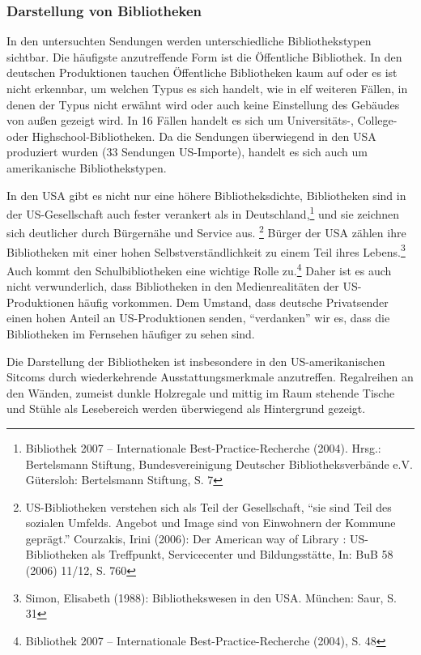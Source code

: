 \subsubsection{Darstellung von
Bibliotheken}\label{darstellung-von-bibliotheken}

In den untersuchten Sendungen werden unterschiedliche Bibliothekstypen
sichtbar. Die häufigste anzutreffende Form ist die Öffentliche
Bibliothek. In den deutschen Produktionen tauchen Öffentliche
Bibliotheken kaum auf oder es ist nicht erkennbar, um welchen Typus es
sich handelt, wie in elf weiteren Fällen, in denen der Typus nicht
erwähnt wird oder auch keine Einstellung des Gebäudes von außen gezeigt
wird. In 16 Fällen handelt es sich um Universitäts-, College- oder
Highschool-Bibliotheken. Da die Sendungen überwiegend in den USA
produziert wurden (33 Sendungen US-Importe), handelt es sich auch um
amerikanische Bibliothekstypen.

In den USA gibt es nicht nur eine höhere Bibliotheksdichte, Bibliotheken
sind in der US-Gesellschaft auch fester verankert als in
Deutschland,\footnote{Bibliothek 2007 -- Internationale
  Best-Practice-Recherche (2004). Hrsg.: Bertelsmann Stiftung,
  Bundesvereinigung Deutscher Bibliotheksverbände e.V. Gütersloh:
  Bertelsmann Stiftung, S. 7} und sie zeichnen sich deutlicher durch
Bürgernähe und Service aus. \footnote{US-Bibliotheken verstehen sich als
  Teil der Gesellschaft, \enquote{sie sind Teil des sozialen Umfelds.
  Angebot und Image sind von Einwohnern der Kommune geprägt.} Courzakis,
  Irini (2006): Der American way of Library : US-Bibliotheken als
  Treffpunkt, Servicecenter und Bildungsstätte, In: BuB 58 (2006) 11/12,
  S. 760} Bürger der USA zählen ihre Bibliotheken mit einer hohen
Selbstverständlichkeit zu einem Teil ihres Lebens.\footnote{Simon,
  Elisabeth (1988): Bibliothekswesen in den USA. München: Saur, S. 31}
Auch kommt den Schulbibliotheken eine wichtige Rolle zu.\footnote{Bibliothek
  2007 -- Internationale Best-Practice-Recherche (2004), S. 48} Daher
ist es auch nicht verwunderlich, dass Bibliotheken in den
Medienrealitäten der US-Produktionen häufig vorkommen. Dem Umstand, dass
deutsche Privatsender einen hohen Anteil an US-Produktionen senden,
\enquote{verdanken} wir es, dass die Bibliotheken im Fernsehen häufiger
zu sehen sind.

Die Darstellung der Bibliotheken ist insbesondere in den
US-amerikanischen Sitcoms durch wiederkehrende Ausstattungsmerkmale
anzutreffen. Regalreihen an den Wänden, zumeist dunkle Holzregale und
mittig im Raum stehende Tische und Stühle als Lesebereich werden
überwiegend als Hintergrund gezeigt.

